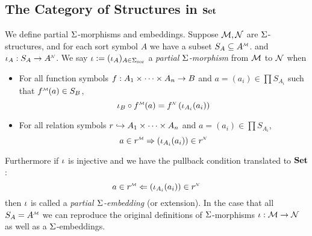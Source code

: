 \subsection{The Category of Structures in $\mathbf{Set}$}
\begin{dfn}
    We define partial $\Sigma$-morphisms and embeddings.
    Suppose $\mathcal{M}, \mathcal{N}$ are $\Sigma$-structures, and for each sort symbol $A$
    we have a subset $S_A \subs \mmintp{A}$.
    and $\io_A : S_A \to \nnintp{A}$.
    We say $\iota := (\iota_A)_{A \in {\Sigma}_\mathrm{sor}}$ 
    a \textit{partial $\Sigma$-morphism} from $\mathcal{M}$ to $\mathcal{N}$ when 
    \begin{itemize}
        \item For all function symbols $f : A_1 \times \dots \times A_n \to B$ 
        and $a = (a_i) \in \prod S_{A_i}$
        such that $\mmintp{f}(a) \in S_B$, 
        \[\io_B \circ \mmintp{f}(a) = \modintp{\NN}{f} \brkt{\io_{A_i}(a_i)}\]
        \item For all relation symbols $r \hookrightarrow A_1 \times \dots \times A_n$ and 
        $a = (a_i) \in \prod S_{A_i}$,
        \[a \in \mmintp{r} \implies (\io_{A_i}(a_i)) \in \modintp{\NN}{r}\]
    \end{itemize}
    Furthermore if $\iota$ is injective and we have the pullback condition
    translated to $\mathbf{Set}$:
    \[
        a \in \mmintp{r} \limplies (\io_{A_i}(a_i)) \in \modintp{\NN}{r}
    \]
    then $\iota$ is called a \textit{partial $\Sigma$-embedding} (or extension). 
    In the case that all $S_A = \mmintp{A}$
    we can reproduce the original definitions of $\Sigma$-morphisms 
    $\iota : \mathcal{M} \to \mathcal{N}$ as well as a $\Sigma$-embeddings.
\end{dfn}
